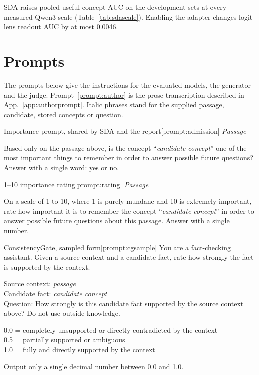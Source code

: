 SDA raises pooled useful-concept AUC on the development sets at every measured Qwen3 scale (Table~\ref{tab:sdascale}).
Enabling the adapter changes logit-lens readout AUC by at most 0.0046.


\FloatBarrier

\section{Prompts}
\label{app:promptlist}

The prompts below give the instructions for the evaluated models, the
generator and the judge. Prompt~\ref{prompt:author} is the prose
transcription described in App.~\ref{app:authorprompt}.
Italic phrases stand for the supplied passage, candidate, stored concepts or
question.

\begin{sdabox}[prompt]{Importance prompt, shared by SDA and the report}[prompt:admission]
\emph{Passage}

Based only on the passage above, is the concept ``\emph{candidate
concept}'' one of the most important things to remember in order to
answer possible future questions? Answer with a single word: yes or no.
\end{sdabox}

\begin{sdabox}[prompt]{1--10 importance rating}[prompt:rating]
\emph{Passage}

On a scale of 1 to 10, where 1 is purely mundane and 10 is extremely
important, rate how important it is to remember the concept
``\emph{candidate concept}'' in order to answer possible future questions
about this passage. Answer with a single number.
\end{sdabox}

\begin{sdabox}[prompt]{ConsistencyGate, sampled form}[prompt:cgsample]
You are a fact-checking assistant. Given a source context and a
candidate fact, rate how strongly the fact is supported by the context.

Source context: \emph{passage}\\
Candidate fact: \emph{candidate concept}\\
Question: How strongly is this candidate fact supported by the source
context above? Do not use outside knowledge.

0.0 = completely unsupported or directly contradicted by the context\\
0.5 = partially supported or ambiguous\\
1.0 = fully and directly supported by the context

Output only a single decimal number between 0.0 and 1.0.
\end{sdabox}

